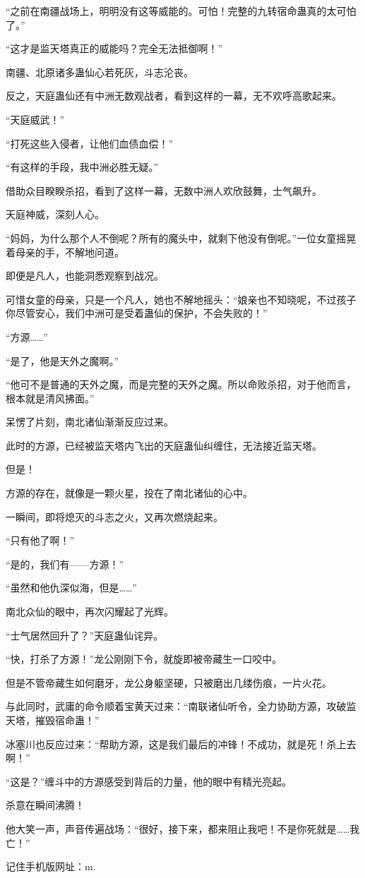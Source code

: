\begin{this_body}
“之前在南疆战场上，明明没有这等威能的。可怕！完整的九转宿命蛊真的太可怕了。”

“这才是监天塔真正的威能吗？完全无法抵御啊！”

南疆、北原诸多蛊仙心若死灰，斗志沦丧。

反之，天庭蛊仙还有中洲无数观战者，看到这样的一幕，无不欢呼高歌起来。

“天庭威武！”

“打死这些入侵者，让他们血债血偿！”

“有这样的手段，我中洲必胜无疑。”

借助众目睽睽杀招，看到了这样一幕，无数中洲人欢欣鼓舞，士气飙升。

天庭神威，深刻人心。

“妈妈，为什么那个人不倒呢？所有的魔头中，就剩下他没有倒呢。”一位女童摇晃着母亲的手，不解地问道。

即便是凡人，也能洞悉观察到战况。

可惜女童的母亲，只是一个凡人，她也不解地摇头：“娘亲也不知晓呢，不过孩子你尽管安心，我们中洲可是受着蛊仙的保护，不会失败的！”

“方源……”

“是了，他是天外之魔啊。”

“他可不是普通的天外之魔，而是完整的天外之魔。所以命败杀招，对于他而言，根本就是清风拂面。”

呆愣了片刻，南北诸仙渐渐反应过来。

此时的方源，已经被监天塔内飞出的天庭蛊仙纠缠住，无法接近监天塔。

但是！

方源的存在，就像是一颗火星，投在了南北诸仙的心中。

一瞬间，即将熄灭的斗志之火，又再次燃烧起来。

“只有他了啊！”

“是的，我们有——方源！”

“虽然和他仇深似海，但是……”

南北众仙的眼中，再次闪耀起了光辉。

“士气居然回升了？”天庭蛊仙诧异。

“快，打杀了方源！”龙公刚刚下令，就旋即被帝藏生一口咬中。

但是不管帝藏生如何磨牙，龙公身躯坚硬，只被磨出几缕伤痕，一片火花。

与此同时，武庸的命令顺着宝黄天过来：“南联诸仙听令，全力协助方源，攻破监天塔，摧毁宿命蛊！”

冰塞川也反应过来：“帮助方源，这是我们最后的冲锋！不成功，就是死！杀上去啊！”

“这是？”缠斗中的方源感受到背后的力量，他的眼中有精光亮起。

杀意在瞬间沸腾！

他大笑一声，声音传遍战场：“很好，接下来，都来阻止我吧！不是你死就是……我亡！”

记住手机版网址：m.

\end{this_body}

